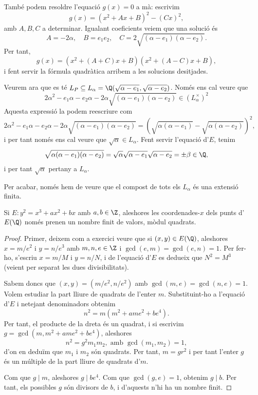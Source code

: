  \begin{remark}
  També podem resoldre l'equació $g(x)=0$ a mà: escrivim
  \[
  g(x) = (x^2+Ax+B)^2 - (Cx)^2,
  \]
  amb $A,B,C$ a determinar. Igualant coeficients veiem que una solució és
  \[
  A = -2\alpha,\quad B = e_1e_2,\quad
  C =  2\sqrt{(\alpha-e_1)(\alpha-e_2)}.
\]
Per tant,
\[
g(x) = (x^2 + (A+C)x + B)(x^2+(A-C)x + B),
\]
i fent servir la fórmula quadràtica arribem a les solucions desitjades.
 \end{remark}
 Veurem ara que es té $L_P\subseteq L_\alpha = \Q(\sqrt{\alpha-e_1},\sqrt{\alpha-e_2})$. Només ens cal veure que
 \[
 2\alpha^2-e_1\alpha-e_2\alpha-2\alpha\sqrt{(\alpha-e_1)(\alpha-e_2)} \in (L_\alpha^\times)^2
 \]
 Aquesta expressió la podem reescriure com
 \[
 2\alpha^2-e_1\alpha-e_2\alpha-2\alpha\sqrt{(\alpha-e_1)(\alpha-e_2)}=\left(\sqrt{\alpha(\alpha-e_1)} - \sqrt{\alpha(\alpha-e_2)}\right)^2,
 \]
 i per tant només ens cal veure que $\sqrt{\alpha}\in L_\alpha$. Fent servir l'equació d'$E$, tenim
 \[
 \sqrt{\alpha(\alpha-e_1)(\alpha -e_2)}=\sqrt{\alpha}\sqrt{\alpha-e_1}\sqrt{\alpha-e_2}=\pm\beta\in\Q,
 \]
 i per tant $\sqrt{\alpha}$ pertany a $L_\alpha$.

Per acabar, només hem de veure que el compost de tots els $L_\alpha$ és una extensió finita.

\begin{lemma}
 Si $E\colon y^2=x^3+ax^2+bx$ amb $a,b\in\Z$, aleshores les coordenades-$x$ dels punts d'$E(\Q)$ només prenen un nombre finit de valors, mòdul quadrats.
\end{lemma}
\begin{proof}
 Primer, deixem com a exercici veure que si $(x,y)\in E(\Q)$, aleshores $x=m/e^2$ i $y=n/e^3$ amb $m,n,e\in \Z$ i $\gcd(e,m)=\gcd(e,n)=1$. Per fer-ho, s'escriu $x=m/M$ i $y=n/N$, i de l'equació d'$E$ es dedueix que $N^2=M^3$ (veient per separat les dues divisibilitats).
 
 Sabem doncs que $(x,y)=(m/e^2,n/e^2)$ amb $\gcd(m,e)=\gcd(n,e)=1$. Volem estudiar la part lliure de quadrats de l'enter $m$. Substituint-ho a l'equació d'$E$ i netejant denominadors obtenim
 \[
 n^2=m(m^2+ame^2+be^4).
 \]
 Per tant, el producte de la dreta és un quadrat, i si escrivim $g=\gcd(m,m^2+ame^2+be^4)$, aleshores
 \[
 n^2 = g^2 m_1 m_2,\text{ amb } \gcd(m_1,m_2)=1,
 \]
 d'on en deduïm que $m_1$ i $m_2$ són quadrats. Per tant, $m=gr^2$ i per tant l'enter $g$ és un múltiple  de la part lliure de quadrats d'$m$.
 
 Com que $g\mid m$, aleshores $g\mid be^4$. Com que $\gcd(g,e)=1$, obtenim $g\mid b$. Per tant, els possibles $g$ són divisors de $b$, i d'aquests n'hi ha un nombre finit.
\end{proof}

